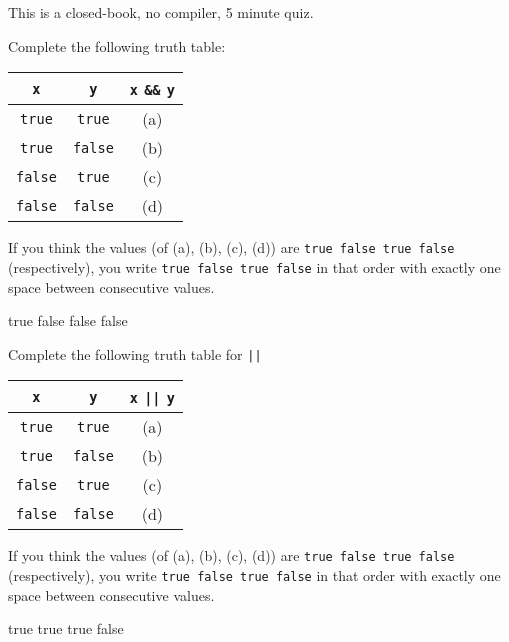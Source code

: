 

This is a closed-book, no compiler, 5 minute quiz.

\nextq
Complete the following truth table:
\begin{longtable}{|c|c||c|}\hline
 \verb!x!	& \verb!y! 	& \verb!x! \verb!&&! \verb!y! \\ \hline
 \verb!true!	& \verb!true!	& (a)                         \\ \hline
 \verb!true!	& \verb!false!  & (b)                         \\ \hline
 \verb!false!	& \verb!true!   & (c)                         \\ \hline
 \verb!false!   & \verb!false!  & (d)                         \\ \hline
\end{longtable}
\vspace{-0.2cm}
If you think the values (of (a), (b), (c), (d)) are
\verb!true false true false! (respectively), you
write
\verb!true false true false! in that order with exactly one space between
consecutive values.
\\
\ANSWER
\begin{answercode}
true false false false
\end{answercode}

\nextq
Complete the following truth table for \verb!||!
\begin{longtable}{|c|c||c|}\hline
\verb!x!       & \verb!y!      & \verb!x! \verb!||! \verb!y! \\ \hline
\verb!true!    & \verb!true!   & (a) \\ \hline
\verb!true!    & \verb!false!  & (b) \\ \hline
\verb!false!   & \verb!true!   & (c) \\ \hline
\verb!false!   & \verb!false!  & (d) \\ \hline
\end{longtable}
If you think the values (of (a), (b), (c), (d)) are
\verb!true false true false! (respectively), you
write
\verb!true false true false! in that order with exactly one space between
consecutive values.
\\
\ANSWER
\begin{answercode}
true true true false
\end{answercode}

